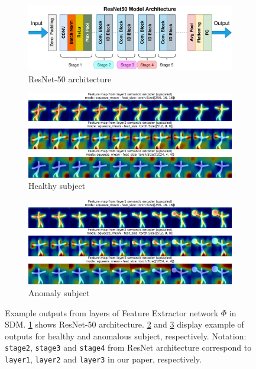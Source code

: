 \begin{figure}[htbp]
  \centering
  \begin{subfigure}{0.75\linewidth}
    \includegraphics[width=\linewidth]{figures/resnet-50-arch.pdf}
    \caption{ResNet-50 architecture}
    \label{fig:resnet50-arch}
  \end{subfigure}

  \begin{subfigure}{0.75\linewidth}
    \includegraphics[width=\linewidth]{figures/fe-layer-healthy.pdf}
    \caption{Healthy subject}
    \label{fig:fe-layer-healthy}
  \end{subfigure}

  \begin{subfigure}{0.75\linewidth}
    \includegraphics[width=\linewidth]{figures/fe-layer-anomaly.pdf}
    \caption{Anomaly subject}
    \label{fig:fe-layer-anomaly}
  \end{subfigure}
  \caption[Example feature maps from semantic encoder]{Example outputs from layers of Feature Extractor network $\Phi$ in \ac{SDM}. \cref{fig:resnet50-arch} shows ResNet-50 architecture. \cref{fig:fe-layer-healthy} and \cref{fig:fe-layer-anomaly} display example of outputs for healthy and anomalous subject, respectively. Notation: \texttt{stage2}, \texttt{stage3} and \texttt{stage4} from ResNet architecture correspond to \texttt{layer1}, \texttt{layer2} and \texttt{layer3} in our paper, respectively.}
  \label{fig:fe-layers}
\end{figure}

